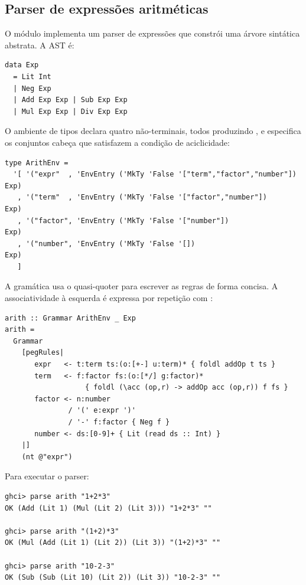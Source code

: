 \subsection{Parser de expressões aritméticas}

O módulo  implementa um parser de expressões
que constrói uma árvore sintática abstrata. A AST é:

\begin{verbatim}
data Exp
  = Lit Int
  | Neg Exp
  | Add Exp Exp | Sub Exp Exp
  | Mul Exp Exp | Div Exp Exp
\end{verbatim}

O ambiente de tipos declara quatro não-terminais, todos produzindo
, e especifica os conjuntos cabeça que satisfazem a
condição de aciclicidade:

\begin{verbatim}
type ArithEnv =
  '[ '("expr"  , 'EnvEntry ('MkTy 'False '["term","factor","number"]) Exp)
   , '("term"  , 'EnvEntry ('MkTy 'False '["factor","number"])        Exp)
   , '("factor", 'EnvEntry ('MkTy 'False '["number"])                 Exp)
   , '("number", 'EnvEntry ('MkTy 'False '[])                         Exp)
   ]
\end{verbatim}

A gramática usa o quasi-quoter para escrever as regras de forma
concisa. A associatividade à esquerda é expressa por repetição com
:

\begin{verbatim}
arith :: Grammar ArithEnv _ Exp
arith =
  Grammar
    [pegRules|
       expr   <- t:term ts:(o:[+-] u:term)* { foldl addOp t ts }
       term   <- f:factor fs:(o:[*/] g:factor)*
                   { foldl (\acc (op,r) -> addOp acc (op,r)) f fs }
       factor <- n:number
               / '(' e:expr ')'
               / '-' f:factor { Neg f }
       number <- ds:[0-9]+ { Lit (read ds :: Int) }
    |]
    (nt @"expr")
\end{verbatim}

Para executar o parser:

\begin{verbatim}
ghci> parse arith "1+2*3"
OK (Add (Lit 1) (Mul (Lit 2) (Lit 3))) "1+2*3" ""

ghci> parse arith "(1+2)*3"
OK (Mul (Add (Lit 1) (Lit 2)) (Lit 3)) "(1+2)*3" ""

ghci> parse arith "10-2-3"
OK (Sub (Sub (Lit 10) (Lit 2)) (Lit 3)) "10-2-3" ""
\end{verbatim}

